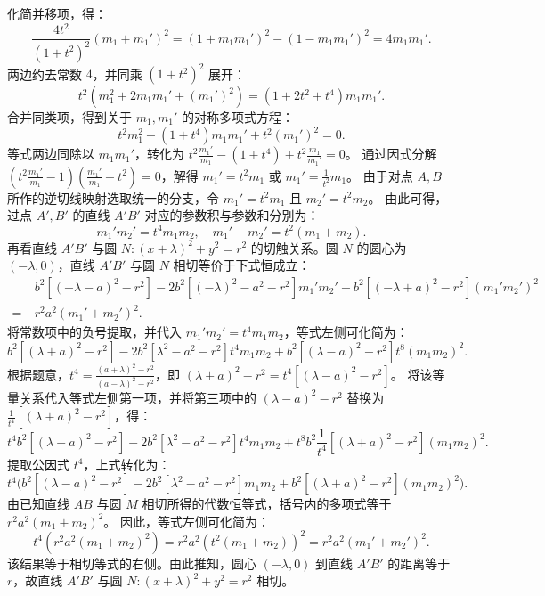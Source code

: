 \begin{solution}
化简并移项，得：
\[ \frac{4t^2}{(1+t^2)^2}(m_1+m_1')^2 = (1+m_1m_1')^2 - (1-m_1m_1')^2 = 4m_1m_1'. \]
两边约去常数 $4$，并同乘 $(1+t^2)^2$ 展开：
\[ t^2 (m_1^2 + 2m_1m_1' + (m_1')^2) = (1+2t^2+t^4)m_1m_1'. \]
合并同类项，得到关于 $m_1, m_1'$ 的对称多项式方程：
\[ t^2 m_1^2 - (1+t^4)m_1m_1' + t^2 (m_1')^2 = 0. \]
等式两边同除以 $m_1m_1'$，转化为 $t^2\frac{m_1'}{m_1} - (1+t^4) + t^2\frac{m_1}{m_1'} = 0$。
通过因式分解 $\left(t^2\frac{m_1'}{m_1} - 1\right)\left(\frac{m_1'}{m_1} - t^2\right) = 0$，解得 $m_1' = t^2 m_1$ 或 $m_1' = \frac{1}{t^2} m_1$。
由于对点 $A, B$ 所作的逆切线映射选取统一的分支，令 $m_1' = t^2 m_1$ 且 $m_2' = t^2 m_2$。
由此可得，过点 $A', B'$ 的直线 $A'B'$ 对应的参数积与参数和分别为：
\[ m_1' m_2' = t^4 m_1 m_2, \quad m_1' + m_2' = t^2(m_1+m_2). \]
再看直线 $A'B'$ 与圆 $N: (x+\lambda)^2 + y^2 = r^2$ 的切触关系。圆 $N$ 的圆心为 $(-\lambda, 0)$，直线 $A'B'$ 与圆 $N$ 相切等价于下式恒成立：
\begin{align*}
    & b^2[(-\lambda-a)^2 - r^2] - 2b^2[(-\lambda)^2-a^2-r^2]m_1'm_2' + b^2[(-\lambda+a)^2 - r^2](m_1'm_2')^2 \\
    =\ & r^2 a^2 (m_1'+m_2')^2.
\end{align*}
将常数项中的负号提取，并代入 $m_1'm_2' = t^4 m_1 m_2$，等式左侧可化简为：
\[ b^2[(\lambda+a)^2 - r^2] - 2b^2[\lambda^2-a^2-r^2]t^4 m_1 m_2 + b^2[(\lambda-a)^2 - r^2]t^8 (m_1 m_2)^2. \]
根据题意，$t^4 = \frac{(a+\lambda)^2 - r^2}{(a-\lambda)^2 - r^2}$，即 $(\lambda+a)^2 - r^2 = t^4 [(\lambda-a)^2 - r^2]$。
将该等量关系代入等式左侧第一项，并将第三项中的 $(\lambda-a)^2 - r^2$ 替换为 $\frac{1}{t^4} [(\lambda+a)^2 - r^2]$，得：
\[ t^4 b^2[(\lambda-a)^2 - r^2] - 2b^2[\lambda^2-a^2-r^2]t^4 m_1 m_2 + t^8 b^2 \frac{1}{t^4} [(\lambda+a)^2 - r^2] (m_1 m_2)^2. \]
提取公因式 $t^4$，上式转化为：
\[ t^4 \Big( b^2[(\lambda-a)^2 - r^2] - 2b^2[\lambda^2-a^2-r^2]m_1 m_2 + b^2[(\lambda+a)^2 - r^2](m_1 m_2)^2 \Big). \]
由已知直线 $AB$ 与圆 $M$ 相切所得的代数恒等式，括号内的多项式等于 $r^2 a^2 (m_1+m_2)^2$。
因此，等式左侧可化简为：
\[ t^4 \left( r^2 a^2 (m_1+m_2)^2 \right) = r^2 a^2 \left( t^2(m_1+m_2) \right)^2 = r^2 a^2 (m_1'+m_2')^2. \]
该结果等于相切等式的右侧。由此推知，圆心 $(-\lambda, 0)$ 到直线 $A'B'$ 的距离等于 $r$，故直线 $A'B'$ 与圆 $N: (x+\lambda)^2 + y^2 = r^2$ 相切。
\end{solution}


